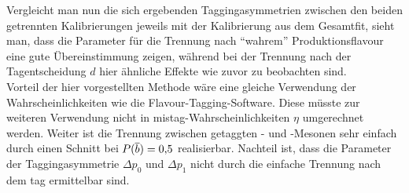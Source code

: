 Vergleicht man nun die sich ergebenden Taggingasymmetrien zwischen den beiden getrennten Kalibrierungen jeweils mit der Kalibrierung aus dem Gesamtfit, sieht man, dass die Parameter für die Trennung nach \enquote{wahrem} Produktionsflavour eine gute Übereinstimmung zeigen, während bei der Trennung nach der Tagentscheidung $d$ hier ähnliche Effekte wie zuvor zu beobachten sind.\\
Vorteil der hier vorgestellten Methode wäre eine gleiche Verwendung der Wahrscheinlichkeiten wie die Flavour-Tagging-Software. Diese müsste zur weiteren Verwendung nicht in mistag-Wahrscheinlichkeiten $\eta$ umgerechnet werden. Weiter ist die Trennung zwischen getaggten \Bz- und \Bzb-Mesonen sehr einfach durch einen Schnitt bei $P({\overline {{b}}})=0{,}5$ realisierbar. Nachteil ist, dass die Parameter der Taggingasymmetrie $\Delta p_0$ und $\Delta p_1$ nicht durch die einfache Trennung nach dem tag ermittelbar sind. 
 
